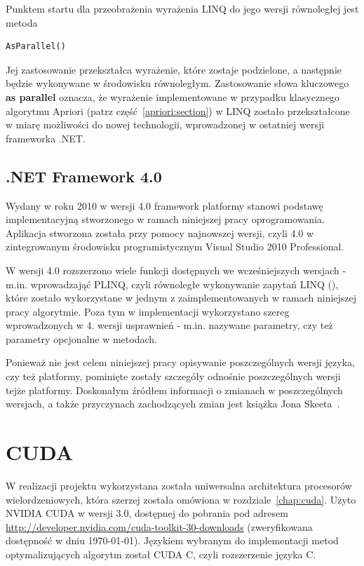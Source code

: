 Punktem startu dla przeobrażenia wyrażenia LINQ do jego wersji równoległej jest metoda 

\begin{verbatim}
AsParallel()
\end{verbatim}

Jej zastosowanie przekształca wyrażenie, które zostaje podzielone, a następnie będzie wykonywane w środowisku równoległym. Zastosowanie słowa kluczowego \textbf{as parallel} oznacza, że wyrażenie implementowane w przypadku klasycznego algorytmu Apriori (patrz część~\ref{apriori:section}) w LINQ zostało przekształcone w miarę możliwości do nowej technologii, wprowadzonej w ostatniej wersji frameworka .NET.

\subsection{.NET Framework 4.0}
Wydany w roku 2010 w wersji 4.0 framework platformy stanowi podstawę implementacyjną stworzonego w ramach niniejszej pracy oprogramowania. Aplikacja stworzona została przy pomocy najnowszej wersji, czyli 4.0 w zintegrowanym środowisku programistycznym Visual Studio 2010 Professional. 

W wersji 4.0 rozszerzono wiele funkcji dostępnych we wcześniejszych wersjach - m.in. wprowadzająć PLINQ, czyli równoległe wykonywanie zapytań LINQ (), które zostało wykorzystane w jednym z zaimplementowanych w ramach niniejszej pracy algorytmie. Poza tym w implementacji wykorzystano szereg wprowadzonych w 4. wersji usprawnień - m.in. nazywane parametry, czy też parametry opcjonalne w metodach. 

Ponieważ nie jest celem niniejszej pracy opisywanie poszczególnych wersji języka, czy też platformy, pominięte zostały szczegóły odnośnie poszczególnych wersji tejże platformy. Doskonałym źródłem informacji o zmianach w poszczególnych wersjach, a także przyczynach zachodzących zmian jest książka Jona Skeeta~\cite{cSharp:inDepthS}.

\section{CUDA}
W realizacji projektu wykorzystana została uniwersalna architektura procesorów wielordzeniowych, która szerzej została omówiona w rozdziale~\ref{chap:cuda}. Użyto NVIDIA CUDA w wersji 3.0, dostępnej do pobrania pod adresem \url{http://developer.nvidia.com/cuda-toolkit-30-downloads} (zweryfikowana dostępność w dniu \today). Językiem wybranym do implementacji metod optymalizujących algorytm został CUDA C, czyli rozszerzenie języka C.

